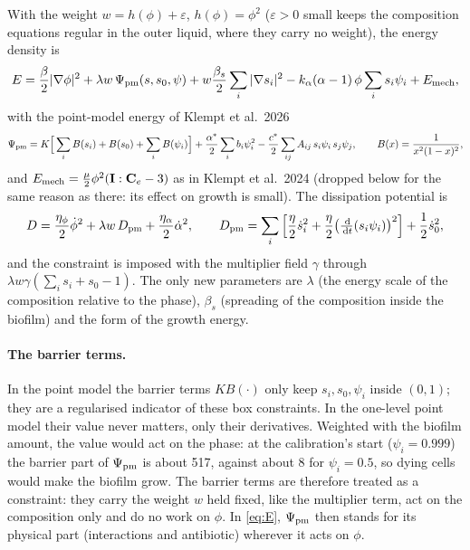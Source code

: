 \documentclass[11pt,a4paper]{article}
\newcommand{\dd}{\,\mathrm{d}}
\begin{document}
\medskip
With the weight $w=h(\phi)+\varepsilon$, $h(\phi)=\phi^2$ ($\varepsilon>0$ small keeps the
composition equations regular in the outer liquid, where they carry no weight), the energy
density is
\begin{equation}
E=\frac{\beta}{2}|\nabla\phi|^2+\lambda w\,\Psi_{\rm pm}(s,s_0,\psi)
+w\frac{\beta_s}{2}\sum_i|\nabla s_i|^2-k_\alpha(\alpha-1)\,\phi\sum_i s_i\psi_i
+E_{\rm mech},
\label{eq:E}
\end{equation}
with the point-model energy of Klempt et al.\ 2026
\begin{equation}
\Psi_{\rm pm}=K\Big[\sum_iB(s_i)+B(s_0)+\sum_iB(\psi_i)\Big]
+\frac{\alpha^*}{2}\sum_ib_i\psi_i^2-\frac{c^*}{2}\sum_{ij}A_{ij}\,s_i\psi_i\,s_j\psi_j,
\qquad B(x)=\frac{1}{x^2(1-x)^2},
\end{equation}
and $E_{\rm mech}=\tfrac{\mu}{2}\phi^2(\mathbf I:\mathbf C_e-3)$ as in Klempt et al.\
2024 (dropped below for the same reason as there: its effect on growth is small). The
dissipation potential is
\begin{equation}
D=\frac{\eta_\phi}{2}\dot\phi^2+\lambda w\,D_{\rm pm}+\frac{\eta_\alpha}{2}\dot\alpha^2,\qquad
D_{\rm pm}=\sum_i\Big[\frac{\eta}{2}\dot s_i^2+\frac{\eta}{2}\big(\tfrac{\dd}{\dd t}(s_i\psi_i)\big)^2\Big]+\frac{1}{2}\dot s_0^2,
\label{eq:D}
\end{equation}
and the constraint is imposed with the multiplier field $\gamma$ through
$\lambda w\gamma(\sum_is_i+s_0-1)$. The only new parameters are $\lambda$ (the energy
scale of the composition relative to the phase), $\beta_s$ (spreading of the composition
inside the biofilm) and the form of the growth energy.

\paragraph{The barrier terms.} In the point model the barrier terms $KB(\cdot)$ only keep
$s_i,s_0,\psi_i$ inside $(0,1)$; they are a regularised indicator of these box constraints.
In the one-level point model their value never matters, only their derivatives. Weighted
with the biofilm amount, the value would act on the phase: at the calibration's start
($\psi_i=0.999$) the barrier part of $\Psi_{\rm pm}$ is about 517, against about 8 for
$\psi_i=0.5$, so dying cells would make the biofilm grow. The barrier terms are therefore
treated as a constraint: they carry the weight $w$ held fixed, like the multiplier term,
act on the composition only and do no work on $\phi$. In \eqref{eq:E}, $\Psi_{\rm pm}$
then stands for its physical part (interactions and antibiotic) wherever it acts on $\phi$.
\end{document}
